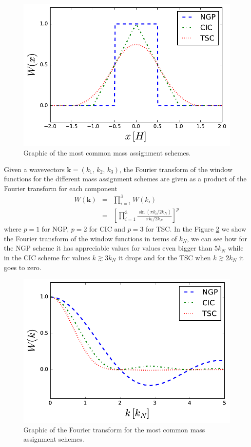 \documentclass[a4paper,fleqn,usenatbib]{mnras}
\begin{document}
\begin{figure}
  \centering
  \includegraphics[width=0.9\columnwidth]{images/MAS_plots.pdf}
  \caption{Graphic of the most common mass assignment schemes.}\label{fig:MASplot}
\end{figure}

Given a wavevectors $\mathbf{k}=(k_1,\,k_2,\,k_3)$, the Fourier transform of 
the window functions for 
the different mass assignment schemes are given as a product of the Fourier transform for each
component
\begin{eqnarray}
  W(\mathbf{k}) &=& \prod_{i=1}^3 W(k_i) \nonumber\\
  &=& \left[ \prod_{i=1}^3 \frac{\sin\left(\pi k_i/ 2 k_N \right)}{\pi k_i / 2 k_N} \right]^p
\end{eqnarray}
where $p=1$ for NGP, $p=2$ for CIC and $p=3$ for TSC. In the Figure 
\ref{fig:MAS_FT} we show the Fourier transform of the window functions in terms
of $k_N$, we can see how for the NGP scheme it has appreciable values for 
values even bigger than $5 k_N$ while in the CIC scheme for values $k\gtrsim 
3 k_N$ it drops and for the TSC when $k\gtrsim 
2 k_N$ it goes to zero.

\begin{figure}
  \centering
  \includegraphics[width=0.9\columnwidth]{images/MAS_FT.pdf}
  \caption{Graphic of the Fourier transform for the most common mass assignment schemes.}
  \label{fig:MAS_FT}
\end{figure}
\end{document}
